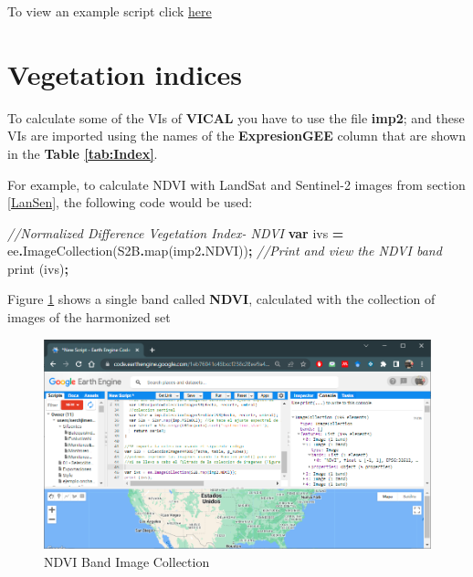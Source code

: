 \documentclass[
]{book}
\newenvironment{Shaded}{\begin{snugshade}}{\end{snugshade}}
\newcommand{\AttributeTok}[1]{\textcolor[rgb]{0.77,0.63,0.00}{#1}}
\newcommand{\CommentTok}[1]{\textcolor[rgb]{0.56,0.35,0.01}{\textit{#1}}}
\newcommand{\FunctionTok}[1]{\textcolor[rgb]{0.00,0.00,0.00}{#1}}
\newcommand{\KeywordTok}[1]{\textcolor[rgb]{0.13,0.29,0.53}{\textbf{#1}}}
\newcommand{\NormalTok}[1]{#1}
\newcommand{\OperatorTok}[1]{\textcolor[rgb]{0.81,0.36,0.00}{\textbf{#1}}}
\begin{document}
To view an example script click \href{https://code.earthengine.google.com/1eb76041c45bccf238c28ee9a4bad955}{here}

\hypertarget{vegetation-indices}{%
\section{Vegetation indices}\label{vegetation-indices}}

To calculate some of the VIs of \textbf{VICAL} you have to use the file \textbf{imp2}; and these VIs are imported using the names of the \textbf{ExpresionGEE} column that are shown in the \textbf{Table \ref{tab:Index}}.

For example, to calculate NDVI with LandSat and Sentinel-2 images from section \ref{LanSen}, the following code would be used:

\begin{Shaded}
\begin{Highlighting}[]
\CommentTok{//Normalized Difference Vegetation Index{-} NDVI}
\KeywordTok{var}\NormalTok{ ivs }\OperatorTok{=}\NormalTok{ ee}\OperatorTok{.}\FunctionTok{ImageCollection}\NormalTok{(S2B}\OperatorTok{.}\FunctionTok{map}\NormalTok{(imp2}\OperatorTok{.}\AttributeTok{NDVI}\NormalTok{))}\OperatorTok{;}
\CommentTok{//Print and view the NDVI band}
\FunctionTok{print}\NormalTok{ (ivs)}\OperatorTok{;}
\end{Highlighting}
\end{Shaded}

Figure \ref{fig:figV4} shows a single band called \textbf{NDVI}, calculated with the collection of images of the harmonized set

\begin{figure}

{\centering \includegraphics[width=0.85\linewidth]{./images/Figure73} 

}

\caption{NDVI Band Image Collection}\label{fig:figV4}
\end{figure}
\end{document}
